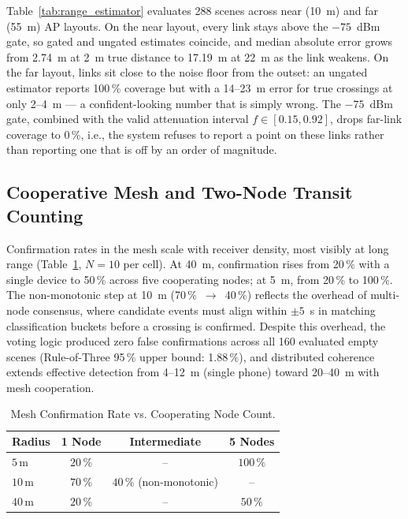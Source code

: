 \documentclass[journal,10pt]{IEEEtran}
\begin{document}
Table~\ref{tab:range_estimator} evaluates 288 scenes across near (10~m) and
far (55~m) AP layouts. On the near layout, every link stays above the
$-75$~dBm gate, so gated and ungated estimates coincide, and median absolute
error grows from 2.74~m at 2~m true distance to 17.19~m at 22~m as the link
weakens. On the far layout, links sit close to the noise floor from the
outset: an ungated estimator reports 100\,\% coverage but with a 14--23~m
error for true crossings at only 2--4~m --- a confident-looking number that
is simply wrong. The $-75$~dBm gate, combined with the valid attenuation
interval $f \in [0.15, 0.92]$, drops far-link coverage to 0\,\%, i.e., the
system refuses to report a point on these links rather than reporting one
that is off by an order of magnitude.

\subsection{Cooperative Mesh and Two-Node Transit Counting}
Confirmation rates in the mesh scale with receiver density, most visibly at
long range (Table~\ref{tab:mesh}, $N=10$ per cell). At 40~m, confirmation
rises from 20\,\% with a single device to 50\,\% across five cooperating
nodes; at 5~m, from 20\,\% to 100\,\%. The non-monotonic step at 10~m
(70\,\%~$\to$~40\,\%) reflects the overhead of multi-node consensus, where
candidate events must align within $\pm5$~s in matching classification
buckets before a crossing is confirmed. Despite this overhead, the voting
logic produced zero false confirmations across all 160 evaluated empty
scenes (Rule-of-Three 95\,\% upper bound: 1.88\,\%), and distributed
coherence extends effective detection from 4--12~m (single phone) toward
20--40~m with mesh cooperation.

\begin{table}[htb!]
  \centering
  \caption{Mesh Confirmation Rate vs. Cooperating Node Count.}
  \label{tab:mesh}
  \footnotesize
  \begin{tabular}{@{}lccc@{}}
    \toprule
    Radius & 1 Node & Intermediate & 5 Nodes \\
    \midrule
    $5$\,m  & $20\,\%$ & --                     & $100\,\%$ \\
    $10$\,m & $70\,\%$ & $40\,\%$ (non-monotonic) & --        \\
    $40$\,m & $20\,\%$ & --                     & $50\,\%$  \\
    \bottomrule
  \end{tabular}
\end{table}
\end{document}
